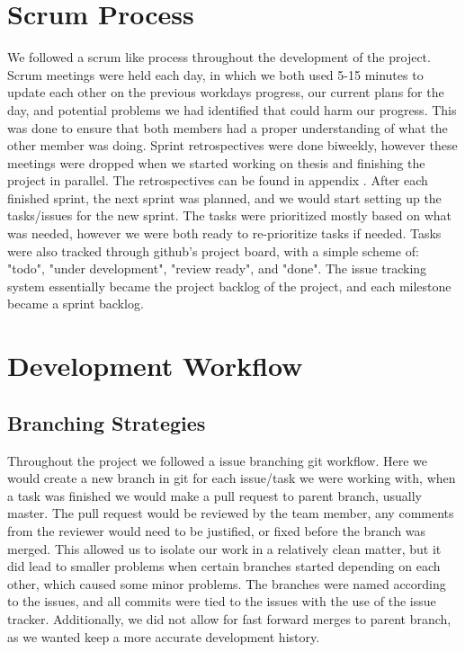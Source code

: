 \section{Scrum Process}
We followed a scrum like process throughout the development of the project.
Scrum meetings were held each day, in which we both used 5-15 minutes to update each
other on the previous workdays progress, our current plans for the day, and potential
problems we had identified that could harm our progress.
This was done to ensure that both members had a proper understanding of what the other
member was doing.
Sprint retrospectives were done biweekly, however these meetings were dropped when
we started working on thesis and finishing the project in parallel.
The retrospectives can be found in appendix .
After each finished sprint, the next sprint was planned, and we would start setting
up the tasks/issues for the new sprint.
The tasks were prioritized mostly based on what was needed, however we were both
ready to re-prioritize tasks if needed.
Tasks were also tracked through github's project board, with a simple scheme of: "todo",
"under development", "review ready", and "done".
The issue tracking system essentially became the project backlog of the project, and
each milestone became a sprint backlog.

\section{Development Workflow}
\subsection{Branching Strategies}
Throughout the project we followed a issue branching git workflow.
Here we would create a new branch in git for each issue/task we were working with,
when a task was finished we would make a pull request to parent branch, usually master.
The pull request would be reviewed by the team member, any comments from the reviewer
would need to be justified, or fixed before the branch was merged.
This allowed us to isolate our work in a relatively clean matter, but
it did lead to smaller problems when certain branches started depending on each other,
which caused some minor problems.
The branches were named according to the issues, and all commits were tied to the issues
with the use of the issue tracker.
Additionally, we did not allow for fast forward merges to parent branch, as we wanted
keep a more accurate development history.

